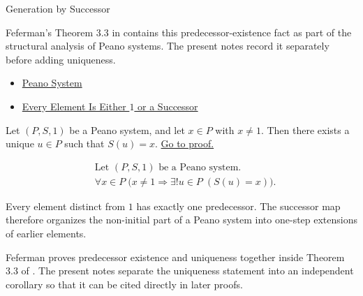\begin{topicbox}{Generation by Successor}
\begin{remark*}
Feferman's Theorem 3.3 in \citet{FefermanNumberSystems1964} contains this
predecessor-existence fact as part of the structural analysis of Peano systems.
The present notes record it separately before adding uniqueness.
\end{remark*}

\begin{dependencies}
\begin{itemize}
  \item \hyperref[def:peano-system]{Peano System}
  \item \hyperref[thm:every-element-is-one-or-a-successor]{Every Element Is Either $1$ or a Successor}
\end{itemize}
\end{dependencies}

\begin{tcolorbox}[colback=corbox, colframe=corborder, arc=2pt,
  left=6pt, right=6pt, top=4pt, bottom=4pt,
  title={\small\textbf{Corollary (Predecessor Existence and Uniqueness Away from \texorpdfstring{$1$}{1})}} ,
  fonttitle=\small\bfseries]
\begin{corollary}
\label{cor:predecessor-exists-unique-away-from-one}
Let $(P,S,1)$ be a Peano system, and let $x \in P$ with $x \neq 1$. Then
there exists a unique $u \in P$ such that $S(u)=x$.
\hyperref[prf:predecessor-exists-unique-away-from-one]{Go to proof.}
\end{corollary}
\end{tcolorbox}

\begin{remark*}
\[
\begin{aligned}
&\text{Let } (P,S,1) \text{ be a Peano system.}\\
&\forall x \in P\;\bigl(x \neq 1 \Longrightarrow \exists! u \in P\;(S(u)=x)\bigr).
\end{aligned}
\]
\end{remark*}

\begin{remark*}[Interpretation]
Every element distinct from $1$ has exactly one predecessor. The successor map
therefore organizes the non-initial part of a Peano system into one-step
extensions of earlier elements.
\end{remark*}

\begin{remark*}
Feferman proves predecessor existence and uniqueness together inside Theorem
3.3 of \citet{FefermanNumberSystems1964}. The present notes separate the
uniqueness statement into an independent corollary so that it can be cited
directly in later proofs.
\end{remark*}


\end{topicbox}
